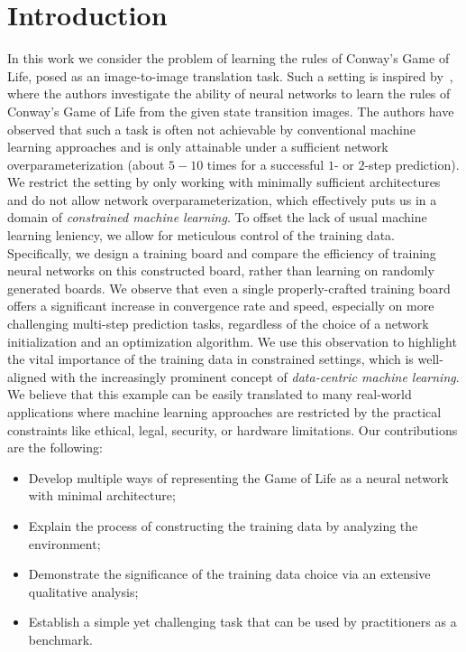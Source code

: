 \documentclass[letterpaper]{article} %
\begin{document}
\section{Introduction}
In this work we consider the problem of learning the rules of Conway's Game of Life, posed as an image-to-image translation task.
Such a setting is inspired by~\cite{springer2021s}, where the authors investigate the ability of neural networks to learn the rules of Conway's Game of Life from the given state transition images.
The authors have observed that such a task is often not achievable by conventional machine learning approaches and is only attainable under a sufficient network overparameterization (about $5-10$ times for a successful $1$- or $2$-step prediction).
We restrict the setting by only working with minimally sufficient architectures and do not allow network overparameterization, which effectively puts us in a domain of \textit{constrained machine learning}.
To offset the lack of usual machine learning leniency, we allow for meticulous control of the training data.
Specifically, we design a training board and compare the efficiency of training neural networks on this constructed board, rather than learning on randomly generated boards.
We observe that even a single properly-crafted training board offers a significant increase in convergence rate and speed, especially on more challenging multi-step prediction tasks, regardless of the choice of a network initialization and an optimization algorithm.
We use this observation to highlight the vital importance of the training data in constrained settings, which is well-aligned with the increasingly prominent concept of \textit{data-centric machine learning}.
We believe that this example can be easily translated to many real-world applications where machine learning approaches are restricted by the practical constraints like ethical, legal, security, or hardware limitations.
Our contributions are the following:
\begin{itemize}
    \item Develop multiple ways of representing the Game of Life as a neural network with minimal architecture;
    \item Explain the process of constructing the training data by analyzing the environment;
    \item Demonstrate the significance of the training data choice via an extensive qualitative analysis;
    \item Establish a simple yet challenging task that can be used by practitioners as a benchmark.
\end{itemize}
\end{document}

